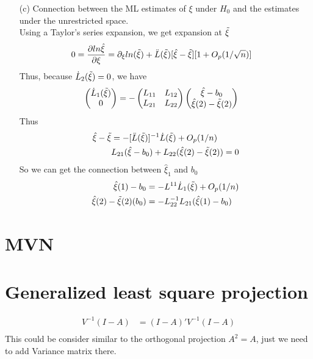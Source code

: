 \begin{itemize}
\item[(c)] Connection between the ML estimates of $\xi$ under $H_0$ and the estimates under the unrestricted space.\\
Using a Taylor's series expansion, we get expansion at $\Tilde{\xi}$
\begin{align*}
0  &= \frac{\partial ln \hat{\xi}}{\partial \xi} = \partial_{\xi} ln(\Tilde{\xi}) + \ddot{L}(\Tilde{\xi})[\hat{\xi} - \Tilde{\xi}] [1+ O_p(1/\sqrt{n})]
\end{align*} 
Thus, because $\dot{L}_2(\Tilde{\xi}) = 0$, we have
\begin{align*}
\begin{pmatrix}
        \dot{L}_1(\Tilde{\xi})\\
           0\\
         \end{pmatrix}   &= - \begin{pmatrix}
        L_{11} & L_{12}\\
          L_{21} & L_{22}\\
         \end{pmatrix} \begin{pmatrix}
         \hat{\xi} - b_0\\
         \hat{\xi}(2) - \Tilde{\xi}(2)\\
         \end{pmatrix}
\end{align*} 
Thus
\begin{align*}
\hat{\xi} - \Tilde{\xi}  &= - [\ddot{L}(\Tilde{\xi})]^{-1} \dot{L}(\Tilde{\xi}) + O_p(1/n)\\
& L_{21} (\hat{\xi} - b_0) + L_{22} (\hat{\xi}(2) - \Tilde{\xi}(2)) = 0
\end{align*} 
So we can get the connection between $\hat{\xi}_1$ and $b_0$
\begin{align*}
\hat{\xi}(1) - b_0  &= - L^{11} \dot{L}_1(\Tilde{\xi}) + O_p(1/n)\\
\hat{\xi}(2) - \Tilde{\xi}(2)(b_0) & = - L_{22}^{-1}L_{21} (\hat{\xi}(1) - b_0) 
\end{align*} 
\end{itemize}

\section{MVN}


\section{Generalized least square projection}
\begin{align*}
V^{-1}(I-A)  &= (I-A)' V^{-1} (I-A)\\
\end{align*} 
This could be consider similar to the orthogonal projection $A^2 = A$, just we need to add Variance matrix there.


